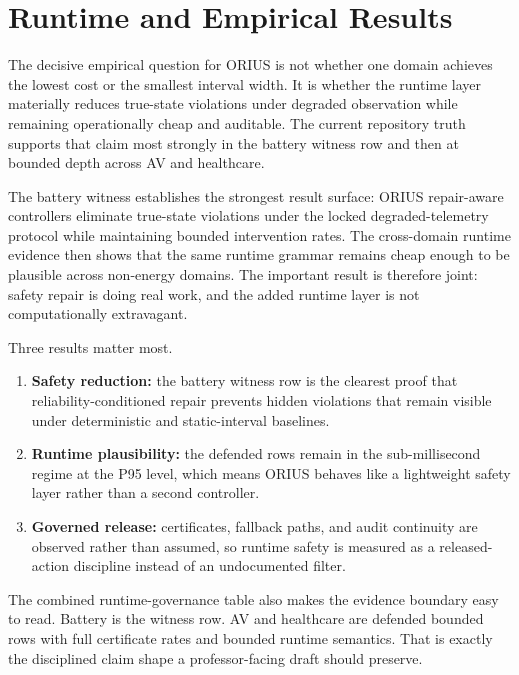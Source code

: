 \section{Runtime and Empirical Results}
\label{sec:prof-results}

The decisive empirical question for ORIUS is not whether one domain achieves the lowest
cost or the smallest interval width. It is whether the runtime layer materially reduces
true-state violations under degraded observation while remaining operationally cheap and
auditable. The current repository truth supports that claim most strongly in the battery
witness row and then at bounded depth across AV and healthcare.

The battery witness establishes the strongest result surface: ORIUS repair-aware
controllers eliminate true-state violations under the locked degraded-telemetry protocol
while maintaining bounded intervention rates. The cross-domain runtime evidence then
shows that the same runtime grammar remains cheap enough to be plausible across
non-energy domains. The important result is therefore joint: safety repair is doing real
work, and the added runtime layer is not computationally extravagant.



Three results matter most.
\begin{enumerate}[leftmargin=1.25em,itemsep=0.2em]
  \item \textbf{Safety reduction:} the battery witness row is the clearest proof that
  reliability-conditioned repair prevents hidden violations that remain visible under
  deterministic and static-interval baselines.
  \item \textbf{Runtime plausibility:} the defended rows remain in the sub-millisecond
  regime at the P95 level, which means ORIUS behaves like a lightweight safety layer
  rather than a second controller.
  \item \textbf{Governed release:} certificates, fallback paths, and audit continuity
  are observed rather than assumed, so runtime safety is measured as a released-action
  discipline instead of an undocumented filter.
\end{enumerate}

The combined runtime-governance table also makes the evidence boundary easy to read.
Battery is the witness row. AV and healthcare are defended bounded rows with full
certificate rates and bounded runtime semantics. That is exactly the disciplined claim
shape a professor-facing draft should preserve.

